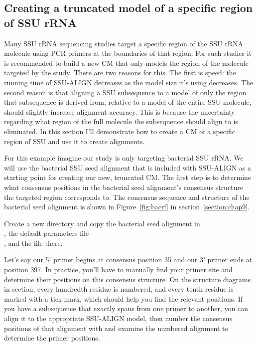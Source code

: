 \subsection{Creating a truncated model of a specific region of SSU rRNA}

Many SSU rRNA sequencing studies target a specific region of the SSU
rRNA molecule using PCR primers at the boundaries of that region. For
such studies it is recommended to build a new CM that only models the
region of the molecule targeted by the study. There are two reasons
for this. The first is speed: the running time of SSU-ALIGN
decreases as the model size it's using decreases. The second reason is
that aligning a SSU subsequence to a model of only the region that
subsequence is derived from, relative to a model of the entire SSU
molecule, should slightly increase alignment accuracy. This is because
the uncertainty regarding what region of the full molecule the subsequence
should align to is eliminated. In this section I'll demonstrate how to
create a CM of a specific region of SSU and use it to create
alignments. 

For this example imagine our study is only targeting bacterial SSU
rRNA. We will use the bacterial SSU seed alignment that is included
with SSU-ALIGN as a starting point for creating our new,
truncated CM. The first step is to determine what consensus positions
in the bacterial seed alignment's consensus structure the targeted
region corresponds to. The consensus sequence and structure of the
bacterial seed alignment is shown in Figure~\ref{fig:bacrf} in
section~\ref{section:chap9}.


Create a new directory and copy the bacterial seed alignment in \\
, the default parameters
file \\ , and the file
 there.

Let's say our 5' primer begins at consensus position 35 and our 3'
primer ends at position 397.  In practice, you'll have to manually
find your primer site and determine their positions on this consensus
structure. On the structure diagrams in section, every
hundredth residue is numbered, and every tenth residue is marked with
a tick mark, which should help you find the relevant positions.  If
you have a subsequence that exactly spans from one primer to another,
you can align it to the appropriate SSU-ALIGN model, then
number the consensus positions of that alignment with
 and examine the numbered alignment to
determine the primer positions.

